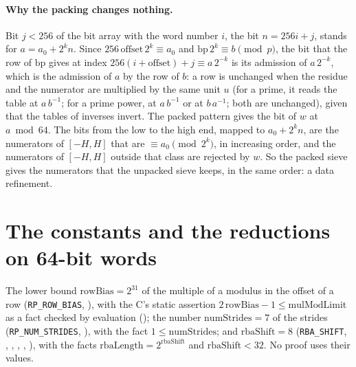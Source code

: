 \paragraph{Why the packing changes nothing.} Bit $j < 256$ of the bit array with the word number
$i$, the bit $n = 256 i + j$, stands for $a = a_0 + 2^k n$. Since
$256\,\mathrm{offset}\, 2^k \equiv a_0$ and $\mathrm{bp}\, 2^k \equiv b \pmod p$, the bit that the
row of $\mathrm{bp}$ gives at index $256(i + \mathrm{offset}) + j \equiv a\, 2^{-k}$ is its
admission of $a\, 2^{-k}$, which is the admission of $a$ by the row of $b$: a row is unchanged when
the residue and the numerator are multiplied by the same unit $u$ (for a prime, it reads the table
at $a\, b^{-1}$; for a prime power, at $a\, b^{-1}$ or at $b\, a^{-1}$; both are unchanged), given
that the tables of inverses invert. The packed pattern gives the bit of $w$ at $a \bmod 64$. The
bits from the low to the high end, mapped to $a_0 + 2^k n$, are the numerators of $[-H, H]$ that are
$\equiv a_0 \pmod{2^k}$, in increasing order, and the numerators of $[-H, H]$ outside that class are
rejected by $w$. So the packed sieve gives the numerators that the unpacked sieve keeps, in the same
order: a data refinement.

\section{The constants and the reductions on 64-bit words}\label{sec:words64}

\begin{definition}\label{def:packingConstants}
  \leanok
  The lower bound $\mathrm{rowBias} = 2^{31}$ of the multiple of a modulus in the offset of a row
  (\verb|RP_ROW_BIAS|, ), with the C's static assertion
  $2\,\mathrm{rowBias} - 1 \le \mathrm{mulModLimit}$ as a fact checked by evaluation
  (); the number $\mathrm{numStrides} = 7$ of the strides
  (\verb|RP_NUM_STRIDES|, ), with the fact
  $1 \le \mathrm{numStrides}$; and $\mathrm{rbaShift} = 8$ (\verb|RBA_SHIFT|,
  , ,
  , ,
  ), with the facts $\mathrm{rbaLength} = 2^{\mathrm{rbaShift}}$ and
  $\mathrm{rbaShift} < 32$. No proof uses their values.
\end{definition}

